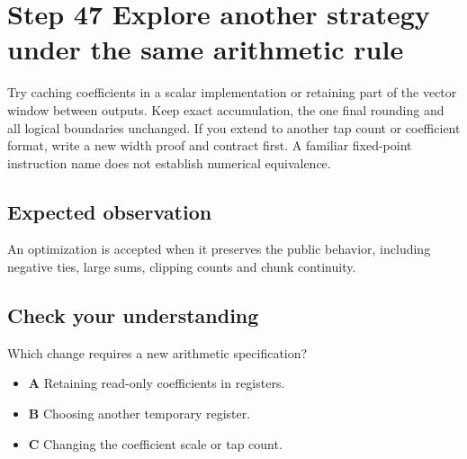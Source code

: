 \section{Step 47 Explore another strategy under the same arithmetic rule}\label{fir-s47}

Try caching coefficients in a scalar implementation or retaining part of the vector window between outputs. Keep exact accumulation, the one final rounding and all logical boundaries unchanged. If you extend to another tap count or coefficient format, write a new width proof and contract first. A familiar fixed-point instruction name does not establish numerical equivalence.

\subsection{Expected observation}
An optimization is accepted when it preserves the public behavior, including negative ties, large sums, clipping counts and chunk continuity.

\subsection{Check your understanding}
Which change requires a new arithmetic specification?

\begin{itemize}
  \item \textbf{A} Retaining read-only coefficients in registers.
  \item \textbf{B} Choosing another temporary register.
  \item \textbf{C} Changing the coefficient scale or tap count.
\end{itemize}
